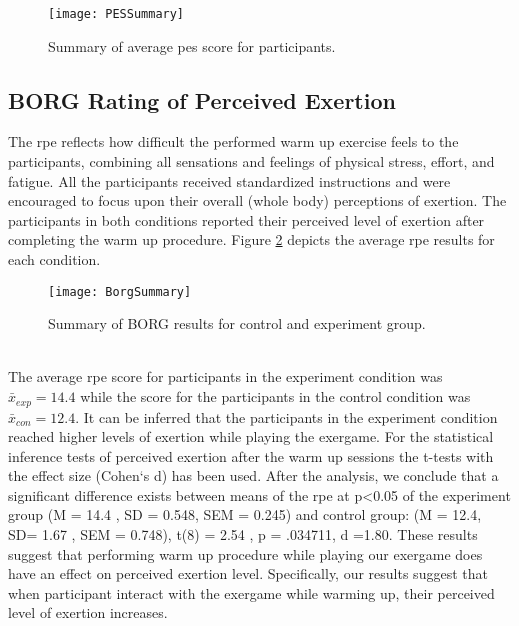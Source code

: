 \begin{figure}[h]
    \centering
    \texttt{[image: PESSummary]}
    \caption{Summary of average \gls{pes} score for participants.}
    \label{fig:pes}
\end{figure}\pagebreak


\subsection{BORG Rating of Perceived Exertion}
The \acrfull{rpe} reflects how difficult the performed warm up exercise feels to the participants, combining all sensations and feelings of physical stress, effort, and fatigue. All the participants received standardized instructions and were encouraged to focus upon their overall (whole body) perceptions of exertion. The participants in both conditions reported their perceived level of exertion after completing the warm up procedure.  Figure \ref{fig:borg} depicts the average \gls{rpe}  results for each condition.\\
\begin{figure}[h]
    \centering
    \texttt{[image: BorgSummary]}
    \caption{Summary of BORG results for control and experiment group.}
    \label{fig:borg}
\end{figure}\\
The average \gls{rpe} score for participants in the experiment condition was   \begin{math}\bar{x}_{exp} = 14.4 \end{math} while the score for the participants in the control condition was   \begin{math}\bar{x}_{con} = 12.4 \end{math}. It can be inferred that the participants in the experiment condition reached higher levels of exertion while playing the exergame. For the statistical inference tests of perceived exertion after the warm up sessions the t-tests with the effect size (Cohen`s d) has been used. After the analysis, we conclude that a significant difference exists  between means of the \gls{rpe}  at p\textless 0.05 of the experiment group (M = 14.4 , SD = 0.548, SEM = 0.245) and control group: (M = 12.4, SD= 1.67 , SEM = 0.748), t(8) = 2.54 , p = .034711, d =1.80.  These results suggest that performing warm up procedure while playing our exergame does have an effect on perceived exertion level. Specifically, our results suggest that when participant interact with the exergame while warming up, their perceived level of exertion increases.
